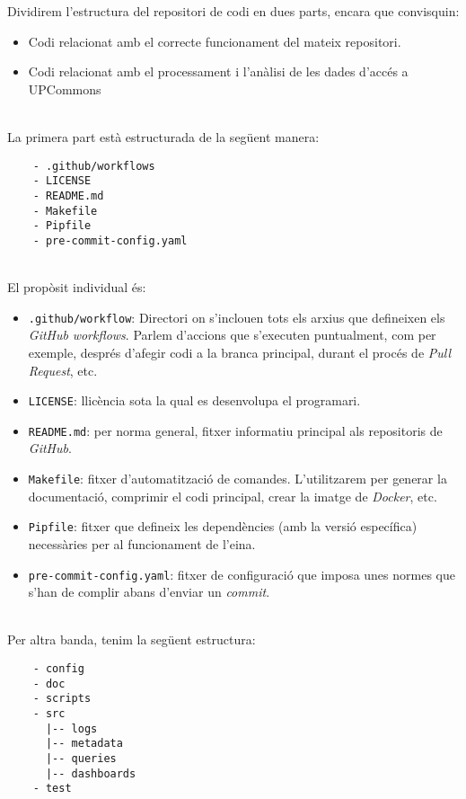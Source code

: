 \noindent
Dividirem l'estructura del repositori de codi en dues parts, encara que convisquin:
\begin{itemize}
    \item Codi relacionat amb el correcte funcionament del mateix repositori.
    \item Codi relacionat amb el processament i l'anàlisi de les dades d'accés a \gls{UPCommons}
\end{itemize}

\noindent \\
La primera part està estructurada de la següent manera:

\begin{verbatim}
    - .github/workflows
    - LICENSE
    - README.md
    - Makefile
    - Pipfile
    - pre-commit-config.yaml
\end{verbatim}

\noindent \\
El propòsit individual és:

\begin{itemize}
    \item \texttt{.github/workflow}: Directori on s'inclouen tots els arxius que defineixen els \textit{\gls{GitHub}} \textit{workflows}.
    Parlem d'accions que s'executen puntualment, com per exemple, després d'afegir codi a la branca principal, durant el procés de \textit{Pull Request}, etc.
    \item \texttt{LICENSE}: llicència sota la qual es desenvolupa el programari.
    \item \texttt{README.md}: per norma general, fitxer informatiu principal als repositoris de \textit{\gls{GitHub}}.
    \item \texttt{Makefile}: fitxer d'automatització de comandes.
    L'utilitzarem per generar la documentació, comprimir el codi principal, crear la imatge de \textit{\gls{Docker}}, etc.
    \item \texttt{Pipfile}: fitxer que defineix les dependències (amb la versió específica) necessàries per al funcionament de l'eina.
    \item \texttt{pre-commit-config.yaml}: fitxer de configuració que imposa unes normes que s'han de complir abans d'enviar un \textit{\gls{commit}}.
\end{itemize}

\clearpage

\noindent \\
Per altra banda, tenim la següent estructura:

\begin{verbatim}
    - config
    - doc
    - scripts
    - src
      |-- logs
      |-- metadata
      |-- queries
      |-- dashboards
    - test
\end{verbatim}

